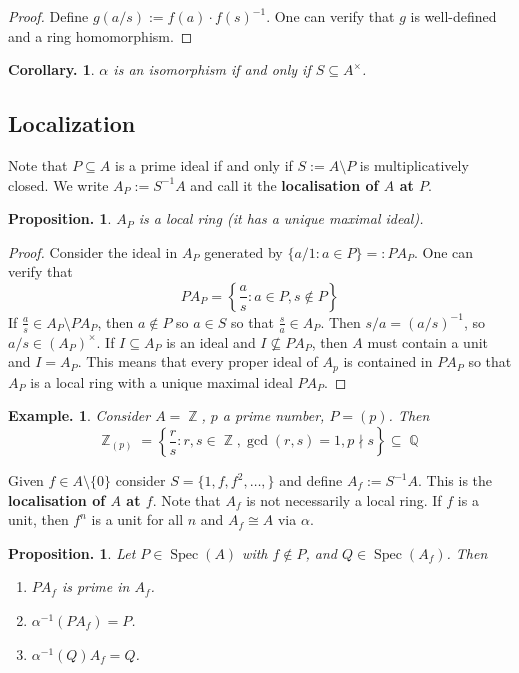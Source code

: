 \documentclass[11pt, a4paper]{memoir}
\DeclareMathOperator{\Q}{{\mathbb{Q}}}
\DeclareMathOperator{\Z}{{\mathbb{Z}}}
\newcommand{\mbf}[1]{{\boldmath\bfseries #1}}
\theoremstyle{change}
\newtheorem{corollary}[theorem]{Corollary.}
\newtheorem{proposition}[theorem]{Proposition.}
\theoremstyle{plain}
\theoremstyle{nonumberplain}
\newtheorem{example}{Example.}
\newtheorem{proof}{Proof}
\DeclareMathOperator{\Spec}{Spec}
\numberwithin{equation}{section}
\begin{document}
\begin{proof}
    Define $g(a/s):=f(a)\cdot f(s)^{-1}$.
    One can verify that $g$ is well-defined and a ring homomorphism.
\end{proof}
\begin{corollary}
    $\alpha$ is an isomorphism if and only if $S\subseteq A^\times$.
\end{corollary}
\subsection{Localization}
Note that $P\subseteq A$ is a prime ideal if and only if $S:=A\setminus P$ is multiplicatively closed.
We write $A_P:=S^{-1}A$ and call it the \mbf{localisation of $A$ at $P$}.
\begin{proposition}
    $A_P$ is a local ring (it has a unique maximal ideal).
\end{proposition}
\begin{proof}
    Consider the ideal in $A_P$ generated by $\{a/1:a\in P\}=:PA_P$.
    One can verify that
    \begin{equation*}
        PA_P=\left\{\frac{a}{s}:a\in P,s\notin P\right\}
    \end{equation*}
    If $\frac{a}{s}\in A_P\setminus PA_P$, then $a\notin P$ so $a\in S$ so that $\frac{s}{a}\in A_P$.
    Then $s/a=(a/s)^{-1}$, so $a/s\in (A_P)^\times$.
    If $I\subseteq A_P$ is an ideal and $I\not\subseteq PA_P$, then $A$ must contain a unit and $I=A_P$.
    This means that every proper ideal of $A_p$ is contained in $PA_P$ so that $A_P$ is a local ring with a unique maximal ideal $PA_P$.
\end{proof}
\begin{example}
    Consider $A=\Z$, $p$ a prime number, $P=(p)$.
    Then
    \begin{equation*}
        \Z_{(p)}=\left\{\frac{r}{s}:r,s\in\Z,\gcd(r,s)=1,p\nmid s\right\}\subseteq\Q
    \end{equation*}
\end{example}
Given $f\in A\setminus\{0\}$ consider $S=\{1,f,f^2,\ldots,\}$ and define $A_f:= S^{-1}A$.
This is the \mbf{localisation of $A$ at $f$}.
Note that $A_f$ is not necessarily a local ring.
If $f$ is a unit, then $f^n$ is a unit for all $n$ and $A_f\cong A$ via $\alpha$.
\begin{proposition}
    Let $P\in\Spec(A)$ with $f\notin P$, and $Q\in\Spec(A_f)$.
    Then
    \begin{enumerate}[nolistsep]
        \item $PA_f$ is prime in $A_f$.
        \item $\alpha^{-1}(PA_f)=P$.
        \item $\alpha^{-1}(Q)A_f=Q$.
    \end{enumerate}
\end{proposition}
\end{document}
